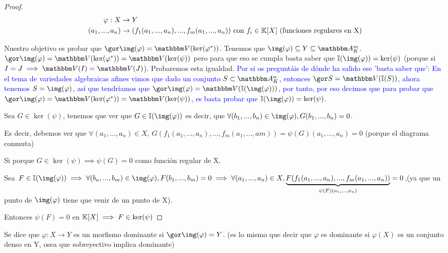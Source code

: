 \begin{proof}
	\begin{align*}
		\varphi: X & \rightarrow Y \\
		(a_1,...,a_n) & \rightarrow (f_1(a_1,...,a_n),...,f_m(a_1,...,a_n)) \text{ con } 	f_i \in \mathbb{K}[X] \text{ (funciones regulares en X)}
	\end{align*}

	Nuestro objetivo es probar que $\cls{\img(\varphi)}=\V(\ker(\varphi^*))$. Tenemos que $\img(\varphi) \subseteq Y \subseteq \A_K^m$. $\cls{\img(\varphi)}=\V(\ker(\varphi^*))=\V(\ker(\psi))$ pero para que eso se cumpla basta saber que $\I(\img(\varphi))=\ker(\psi)$ (porque si $I=J \implies \V(I)=\V(J)$). Probaremos esta igualdad.
	\textcolor{blue}{Por si os preguntáis de dónde ha salido ese 'basta saber que': En el tema de variedades algebraicas afines vimos que dado un conjunto $S \subset \Akn$, entonces $\cls{S}=\V(\I(S))$, ahora tenemos $S=\img(\varphi)$, así que tendríamos que $\cls{\img(\varphi)}=\V(\I(\img(\varphi)))$, por tanto, por eso decimos que para probar que $\cls{\img(\varphi)}=\V(\ker(\varphi^*))=\V(\ker(\psi))$, es basta probar que $\I(\img(\varphi))=\ker(\psi)$}.

	\proofpart{	$\ker(\psi) \subset \I(\img(\varphi))$:}


	Sea $G \in \ker(\psi)$, tenemos que ver que $G \in \I(\img(\varphi))$ es decir, que $\forall (b_1,...,b_n) \in \img(\varphi), G(b_1,...,b_n)=0$.

	Es decir, debemos ver que $\forall (a_1,...,a_n) \in X$,  $G(f_1(a_1,...,a_n),...,f_m(a_1,...,am))=\psi(G)(a_1,...,a_n)=0$ (porque el diagrama conmuta)

	Si porque $G \in \ker(\psi) \implies \psi(G)=0$ como función regular de X.

	\proofpart{$\ker(\psi) \supset \I(\img(\varphi))$:}


	Sea $F \in \I(\img(\varphi)) \implies \forall (b_a,...,b_m) \in  \img(\varphi), F(b_1,...,b_m)=0 \implies \forall(a_1,...,a_n) \in X, \underbrace{F(f_1(a_1,...,a_n),...,f_m(a_1,...,a_n))}_{\psi(F)(a_1,...,a_n)}=0$,(ya que un punto de $\img(\varphi)$ tiene que venir de un punto de X).

	Entonces $\psi(F)=0$ en $\mathbb{K}[X] \implies F \in \ker(\psi)$
\end{proof}


\begin{defn}
	Se dice que $\varphi: X \rightarrow Y$ es un morfismo dominante si $\cls{\img(\varphi)}=Y$. (es lo mismo que decir que $\varphi$ es dominante si $\varphi(X)$ es un conjunto denso en Y, osea que sobreyectivo implica dominante)
\end{defn}

